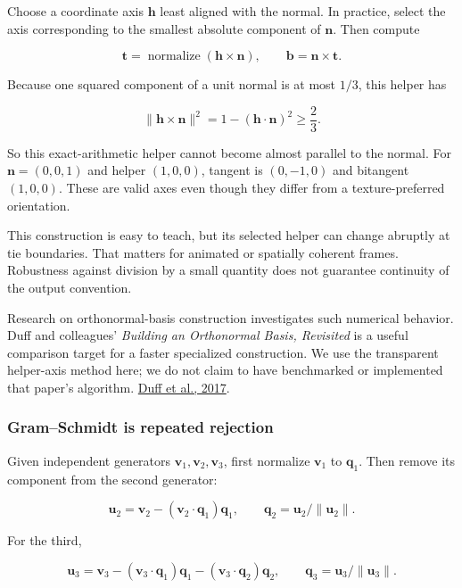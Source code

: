 Choose a coordinate axis \(\mathbf h\) least aligned with the normal. In practice, select the axis corresponding to the smallest absolute component of \(\mathbf n\). Then compute

\[
\mathbf t=\operatorname{normalize}(\mathbf h\times\mathbf n),
\qquad \mathbf b=\mathbf n\times\mathbf t.
\]

Because one squared component of a unit normal is at most \(1/3\), this helper has

\[
\|\mathbf h\times\mathbf n\|^2
=1-(\mathbf h\cdot\mathbf n)^2\ge\frac23.
\]

So this exact-arithmetic helper cannot become almost parallel to the normal. For \(\mathbf n=(0,0,1)\) and helper \((1,0,0)\), tangent is \((0,-1,0)\) and bitangent \((1,0,0)\). These are valid axes even though they differ from a texture-preferred orientation.

This construction is easy to teach, but its selected helper can change abruptly at tie boundaries. That matters for animated or spatially coherent frames. Robustness against division by a small quantity does not guarantee continuity of the output convention.

Research on orthonormal-basis construction investigates such numerical behavior. Duff and colleagues' \emph{Building an Orthonormal Basis, Revisited} is a useful comparison target for a faster specialized construction. We use the transparent helper-axis method here; we do not claim to have benchmarked or implemented that paper's algorithm. \href{https://graphics.pixar.com/library/OrthonormalB/paper.pdf}{Duff et al., 2017}.

\subsubsection{Gram--Schmidt is repeated rejection}\label{01-foundations-i-ch017-gramschmidt-is-repeated-rejection}

Given independent generators \(\mathbf v_1,\mathbf v_2,\mathbf v_3\), first normalize \(\mathbf v_1\) to \(\mathbf q_1\). Then remove its component from the second generator:

\[
\mathbf u_2=\mathbf v_2-(\mathbf v_2\cdot\mathbf q_1)\mathbf q_1,
\qquad \mathbf q_2=\mathbf u_2/\|\mathbf u_2\|.
\]

For the third,

\[
\mathbf u_3=\mathbf v_3
-(\mathbf v_3\cdot\mathbf q_1)\mathbf q_1
-(\mathbf v_3\cdot\mathbf q_2)\mathbf q_2,
\qquad \mathbf q_3=\mathbf u_3/\|\mathbf u_3\|.
\]

